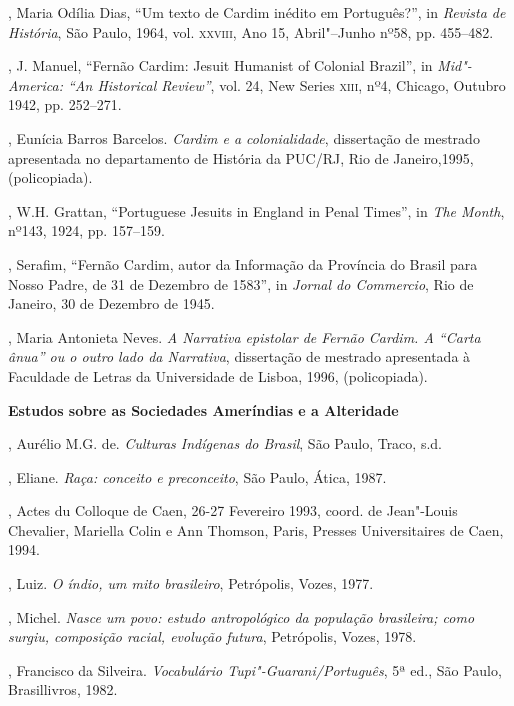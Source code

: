 \begin{bibliohedra}
, Maria Odília Dias, ``Um texto de Cardim inédito em Português?'',
in \textit{Revista de História}, São Paulo, 1964, vol. \textsc{xxviii}, Ano 15,
Abril"--Junho nº58, pp. 455--482.

, J. Manuel, ``Fernão Cardim: Jesuit Humanist of Colonial
Brazil'', in \textit{Mid"-America: ``An Historical Review''}, vol. 24, New
Series \textsc{xiii}, nº4, Chicago, Outubro 1942, pp. 252--271.

, Eunícia Barros Barcelos. \textit{Cardim e a colonialidade}, 
dissertação de mestrado apresentada no departamento de História da
PUC/RJ, Rio de Janeiro,1995, (policopiada).

, W.H. Grattan, ``Portuguese Jesuits in England in Penal Times'',
in \textit{The Month}, nº143, 1924, pp. 157--159.

, Serafim, ``Fernão Cardim, autor da Informação da Província do
Brasil para Nosso Padre, de 31 de Dezembro de 1583'', in \textit{Jornal
do Commercio}, Rio de Janeiro, 30 de Dezembro de 1945.

, Maria Antonieta Neves. \textit{A Narrativa epistolar de Fernão
Cardim. A ``Carta ânua'' ou o outro lado da Narrativa}, dissertação de
mestrado apresentada à Faculdade de Letras da Universidade de Lisboa,
1996, (policopiada).

\vspace*{2ex}
\scriptsize\textbf{Estudos sobre as Sociedades Ameríndias e a Alteridade}

, Aurélio M.G. de. \textit{Culturas Indígenas do Brasil}, São Paulo, Traco, s.d.

, Eliane. \textit{Raça: conceito e preconceito}, São Paulo, Ática, 1987.

, Actes du Colloque de Caen, 26-27 Fevereiro 1993, coord.
de Jean"-Louis Chevalier, Mariella Colin e Ann Thomson, Paris, Presses
Universitaires de Caen, 1994.

, Luiz. \textit{O índio, um mito brasileiro}, Petrópolis, Vozes, 1977.

, Michel. \textit{Nasce um povo: estudo antropológico da
população brasileira; como surgiu, composição racial, evolução futura}, 
Petrópolis, Vozes, 1978.

, Francisco da Silveira. \textit{Vocabulário
Tupi"-Guarani/Português}, 5ª ed., São Paulo, Brasillivros, 1982.


\end{bibliohedra}
